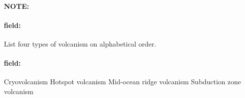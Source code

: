 \documentclass[12pt]{article}
\newenvironment{note}{\paragraph{NOTE:}}{}
\newenvironment{field}{\paragraph{field:}}{}
\begin{document}
\begin{note}
   \begin{field}
        List four types of volcanism on alphabetical order.
   \end{field}
   \begin{field}
		Cryovolcanism
		Hotspot volcanism
		Mid-ocean ridge volcanism
		Subduction zone volcanism
   \end{field}
\end{note}
\end{document}
